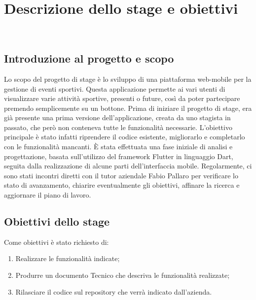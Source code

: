 
\chapter{Descrizione dello stage e obiettivi}
\label{cap:Descrizione dello stage e obiettivi}

\\

\section{Introduzione al progetto e scopo}
Lo scopo del progetto di stage è lo sviluppo di una piattaforma web-mobile per la gestione di eventi sportivi. Questa applicazione permette ai vari utenti di visualizzare varie attività sportive, presenti o future, così da poter partecipare premendo semplicemente su un bottone. Prima di iniziare il progetto di stage, era già presente una prima versione dell'applicazione, creata da uno stagista in passato, che però non conteneva tutte le funzionalità necessarie. L'obiettivo principale è stato infatti riprendere il codice esistente, migliorarlo e completarlo con le funzionalità mancanti. È stata effettuata una fase iniziale di analisi e progettazione, basata sull’utilizzo del framework Flutter in linguaggio Dart, seguita dalla realizzazione di alcune parti dell’interfaccia mobile.
Regolarmente, ci sono stati incontri diretti con il tutor aziendale Fabio Pallaro per verificare lo stato di avanzamento, chiarire eventualmente gli obiettivi, affinare la ricerca e aggiornare il piano di lavoro.

\section{Obiettivi dello stage}
Come obiettivi è stato richiesto di:
\begin{enumerate}
	\item Realizzare le funzionalità indicate;
	\item Produrre un documento Tecnico che descriva le funzionalità realizzate;
	\item Rilasciare il codice sul repository che verrà indicato dall’azienda.\\
	
\end{enumerate}
